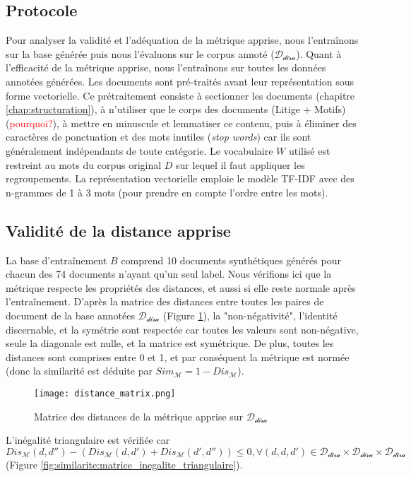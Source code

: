 \subsection{Protocole}
Pour analyser la validité et l'adéquation de la métrique apprise, nous l'entraînons sur la base générée puis nous l'évaluons sur le corpus annoté ($\mathcal{D_{\text{dira}}}$). Quant à l'efficacité de la métrique apprise, nous l'entraînons sur toutes les données annotées générées. Les documents sont pré-traités avant leur représentation sous forme vectorielle. Ce prétraitement consiste à sectionner les documents (chapitre \ref{chap:structuration}), à n'utiliser que le corps des documents (Litige + Motifs) (\textcolor{red}{pourquoi?}), à mettre en minuscule et lemmatiser ce contenu, puis à éliminer des caractères de ponctuation et des mots inutiles (\textit{stop words})  car ils sont généralement indépendants de toute catégorie. Le vocabulaire $W$ utilisé est restreint au mots du corpus original $D$ sur lequel il faut appliquer les regroupements. La représentation vectorielle emploie le modèle TF-IDF avec des n-grammes de 1 à 3 mots (pour prendre en compte l'ordre entre les mots).

\subsection{Validité de la distance apprise}
La base d'entraînement $B$ comprend 10 documents synthétiques générés pour chacun des 74 documents n'ayant qu'un seul label. Nous vérifions ici que la métrique respecte les propriétés des distances, et aussi si elle reste normale après l'entraînement. D'après la matrice des distances entre toutes les paires de document de la base annotées $\mathcal{D_{\text{dira}}}$ (Figure \ref{fig:similarite:distance_matrix}),  la "non-négativité", l'identité discernable, et la symétrie sont respectée car toutes les valeurs sont non-négative, seule la diagonale est nulle, et la matrice est symétrique. De plus, toutes les distances sont comprises entre 0 et 1, et par conséquent la métrique est normée (donc la similarité est déduite par $Sim_\mathcal{M} = 1 - Dis_\mathcal{M}$).

\begin{figure}[!htb]
	\centering \texttt{[image: distance\_matrix.png]}
	\caption{Matrice des distances de la métrique apprise sur $\mathcal{D_{\text{dira}}}$}\label{fig:similarite:distance_matrix}
\end{figure}

L'inégalité triangulaire est vérifiée car $Dis_\mathcal{M}(d,d'') - (Dis_\mathcal{M}(d,d') + Dis_\mathcal{M}(d',d'')) \leq 0, \forall (
d,d,d') \in \mathcal{D_{\text{dira}}} \times \mathcal{D_{\text{dira}}} \times \mathcal{D_{\text{dira}}}$ (Figure \ref{fig:similarite:matrice_inegalite_triangulaire}).

